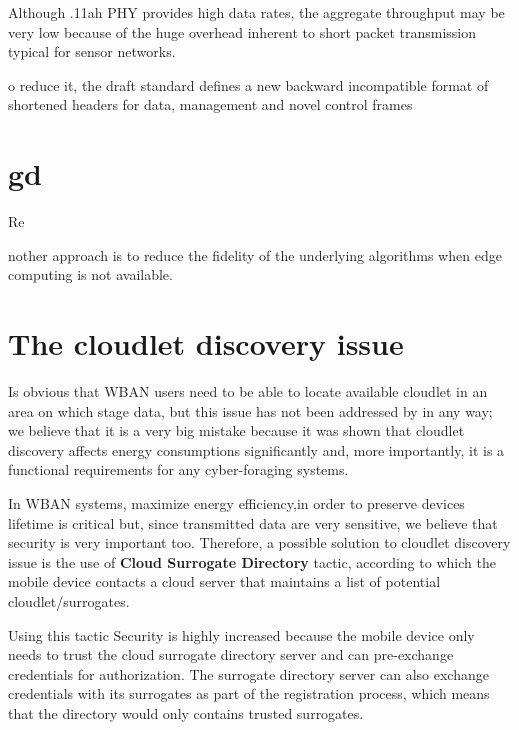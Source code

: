 \documentclass[sigchi]{acmart}
\begin{document}
Although .11ah PHY provides high data rates, the aggregate throughput may be very low because of the huge overhead inherent to short packet transmission typical for sensor networks.

o reduce it, the draft standard defines a new backward incompatible
format of shortened headers for data, management and novel control frames








\section{gd}

Re










nother approach is to reduce the
ﬁdelity of the underlying algorithms when edge computing is
not available.


\section{The cloudlet discovery issue}

Is obvious that WBAN users need to be able to locate available cloudlet in an area on which stage data, but this issue has not been addressed by \citet{MSAReport} in any way; we believe that it is a very big mistake because it was shown that cloudlet discovery affects energy consumptions significantly and, more importantly, it is a functional requirements for any cyber-foraging systems.

In WBAN systems, maximize energy efficiency,in order to preserve devices lifetime is critical but, since transmitted data are very sensitive, we believe that security is very important too. Therefore, a possible solution to cloudlet discovery issue is the use of \textbf{Cloud Surrogate Directory} tactic, according to which the mobile device contacts a cloud server that maintains a list of potential cloudlet/surrogates. 

Using this tactic Security is highly increased because the mobile device only needs to trust the cloud surrogate directory server and can pre-exchange credentials for authorization. The surrogate directory server can also exchange credentials with its surrogates as part of the registration process, which means that the directory would only contains trusted surrogates.
\end{document}
